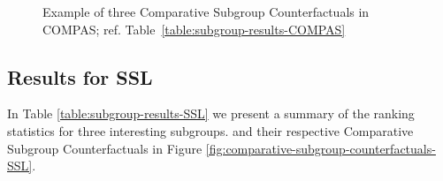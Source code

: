 \documentclass{article}
\begin{document}
\begin{figure}[ht]
\begin{minipage}{1\linewidth}
\caption{Example of three Comparative Subgroup Counterfactuals in COMPAS; ref. Table~\ref{table:subgroup-results-COMPAS}}
\label{fig:comparative-subgroup-counterfactuals-COMPAS}
\end{minipage}
\end{figure}


\subsection{Results for SSL}

In Table \ref{table:subgroup-results-SSL} we present a summary of the ranking statistics for three interesting subgroups.
and their respective Comparative Subgroup Counterfactuals in Figure \ref{fig:comparative-subgroup-counterfactuals-SSL}.

\begin{table}[ht]
\caption{Example of three unfair subgroups in SSL}
  \label{table:subgroup-results-SSL}
  \centering
{}
\end{table}
\end{document}
